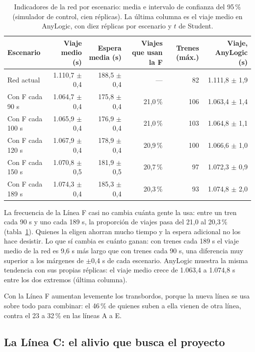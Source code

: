 \documentclass{article}
\begin{document}
\begin{table}[htbp]
  \centering\small
  \caption{Indicadores de la red por escenario: media e intervalo de confianza del 95\,\% (simulador de
  control, cien réplicas). La última columna es el viaje medio en AnyLogic, con diez réplicas por escenario
  y $t$ de Student.}
  \label{tab:indicadores}
  \begin{tabular}{lrrrrr}
    \toprule
    Escenario & Viaje medio (s) & Espera media (s) & Viajes que usan la F & Trenes (máx.) & Viaje, AnyLogic (s) \\
    \midrule
    Red actual     & 1.110,7 $\pm$ 0,4 & 188,5 $\pm$ 0,4 & ---       & 82  & 1.111,8 $\pm$ 1,9 \\
    Con F cada 90 s    & 1.064,7 $\pm$ 0,4 & 175,8 $\pm$ 0,4 & 21,0\,\% & 106 & 1.063,4 $\pm$ 1,4 \\
    Con F cada 100 s   & 1.065,9 $\pm$ 0,4 & 176,9 $\pm$ 0,4 & 21,0\,\% & 103 & 1.064,8 $\pm$ 1,1 \\
    Con F cada 120 s   & 1.067,9 $\pm$ 0,4 & 178,9 $\pm$ 0,4 & 20,9\,\% & 100 & 1.066,6 $\pm$ 1,0 \\
    Con F cada 150 s   & 1.070,8 $\pm$ 0,5 & 181,9 $\pm$ 0,5 & 20,7\,\% & 97  & 1.072,3 $\pm$ 0,9 \\
    Con F cada 189 s   & 1.074,3 $\pm$ 0,4 & 185,3 $\pm$ 0,4 & 20,3\,\% & 93  & 1.074,8 $\pm$ 2,0 \\
    \bottomrule
  \end{tabular}
\end{table}

La frecuencia de la Línea F casi no cambia cuánta gente la usa: entre un tren cada 90 s y uno cada 189 s,
la proporción de viajes pasa del 21,0 al 20,3\,\% (tabla~\ref{tab:indicadores}). Quienes la eligen ahorran
mucho tiempo y la espera adicional no los hace desistir. Lo que sí cambia es cuánto ganan: con trenes cada
189 s el viaje medio de la red es 9,6 s más largo que con trenes cada 90 s, una diferencia muy superior a los
márgenes de $\pm$0,4 s de cada escenario. AnyLogic muestra la misma tendencia con sus propias réplicas: el
viaje medio crece de 1.063,4 a 1.074,8 s entre los dos extremos (última columna).

Con la Línea F aumentan levemente los transbordos, porque la nueva línea se usa sobre todo para combinar:
el 46\,\% de quienes suben a ella vienen de otra línea, contra el 23 a 32\,\% en las líneas A a E.

\subsection{La Línea C: el alivio que busca el proyecto}
\end{document}
